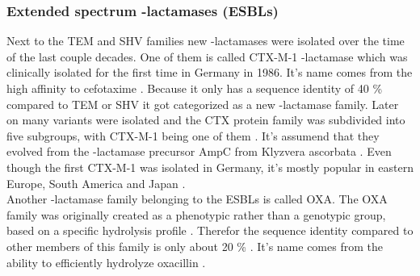 \subsubsection{Extended spectrum \textbeta-lactamases (ESBLs)}
Next to the TEM and SHV families new \textbeta-lactamases were isolated over the time of the last couple decades. One of them is called CTX-M-1 \textbeta-lactamase which was clinically isolated for the first time in Germany in 1986. It's name comes from the high affinity to cefotaxime \cite{fernandes_-lactams:_2013}. Because it only has a sequence identity of 40 \% compared to TEM or SHV \cite{bradford_extended-spectrum_2001} it got categorized as a new \textbeta-lactamase family. Later on many variants were isolated and the CTX protein family was subdivided into five subgroups, with CTX-M-1 being one of them  \cite{fernandes_-lactams:_2013}.
It's assumend that they evolved from the \textbeta-lactamase precursor AmpC from Klyzvera ascorbata  \cite{bradford_extended-spectrum_2001}. Even though the first CTX-M-1 was isolated in Germany, it's mostly popular in eastern Europe, South America and Japan \cite{bradford_extended-spectrum_2001}. \\
Another \textbeta-lactamase family belonging to the ESBLs is called OXA.
The OXA family was originally created as a phenotypic rather than a genotypic group, based on a specific hydrolysis profile \cite{bradford_extended-spectrum_2001}. Therefor the sequence identity compared to other members of this family is only about 20 \% \cite{bradford_extended-spectrum_2001}. It's name comes from the ability to efficiently hydrolyze oxacillin \cite{bradford_extended-spectrum_2001}.
\label{section:esbls}

